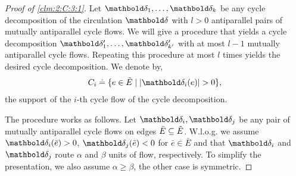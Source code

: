 \documentclass[nobib]{tufte-handout}
\newcommand{\Etil}{\Tilde{E}}
\begin{document}
\begin{proof}[Proof of \cref{clm:2:C:3:1}]
Let $\vdelta_1, \dots, \vdelta_k$ be any cycle decomposition of the circulation $\vdelta$ with $l > 0$ antiparallel pairs of mutually antiparallel cycle flows. We will give a procedure that yields a cycle decomposition $\vdelta_1', \dots, \vdelta_{k'}'$ with at most $l - 1$ mutually antiparallel cycle flows. Repeating this procedure at most $l$ times yields the desired cycle decomposition. We denote by, \begin{align*}
    C_i \defeq \{e \in \Etil \mid |\vdelta_i(e)| > 0\},
\end{align*} the support of the $i$-th cycle flow of the cycle decomposition.

The procedure works as follows. Let $\vdelta_i,\vdelta_j$ be any pair of mutually antiparallel cycle flows on edges $\bar{E} \subseteq \Etil$. W.l.o.g. we assume $\vdelta_i(\bar{e}) > 0$, $\vdelta_j(\bar{e}) < 0$ for $\bar{e} \in \bar{E}$ and that $\vdelta_i$ and $\vdelta_j$ route $\alpha$ and $\beta$ units of flow, respectively. To simplify the presentation, we also assume $\alpha \geq \beta$, the other case is symmetric.


\end{proof}
\end{document}
